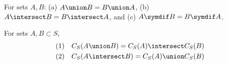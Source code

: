 \begin{prop}
  For sets $A, B$: (a) $A \union B = B \union A$, (b) $A \intersect B = B \intersect A$, and (c)  $A \symdif B = B \symdif A$.
\end{prop}

\begin{prop}
  For sets $A, B \subset S$,
  \[
    \begin{aligned}
      \text{(1)} \quad & C_S(A \union B) = C_S(A) \intersect C_S(B) \\
      \text{(2)} \quad & C_S(A \intersect B) = C_S(A) \union C_S(B)
    \end{aligned}
  \]
\end{prop}


